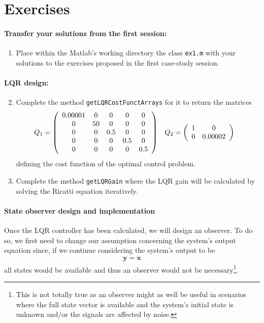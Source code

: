 %
\section{Exercises}
	\paragraph{Transfer your solutions from the first session:}
	\begin{enumerate}
		\item Place within the Matlab's working directory the class \texttt{ex1.m} with your solutions to the exercises proposed in the first case-study session. 
	\end{enumerate}
	\paragraph{LQR design:}
	\begin{enumerate}
		\setcounter{enumi}{1}
		\item Complete the method \texttt{getLQRCostFunctArrays} for it to return the matrices %
		\begin{align}
			Q_1 & = \matriz{ccccc}{
				0.00001 & 0 & 0 & 0 & 0 \\
				0 & 50 & 0 & 0 & 0 \\
				0 & 0 & 0.5 & 0 & 0 \\
				0 & 0 & 0 & 0.5 & 0 \\
				0 & 0 & 0 & 0 & 0.5
			} & 
			Q_2 & = \matriz{cc}{
				1 & 0\\
				0 & 0.00002
			}
		\end{align}
		defining the cost function of the optimal control problem. 

		\item Complete the method \texttt{getLQRGain} where the LQR gain will be calculated by solving the Ricatti equation iteratively.

	\end{enumerate}

	\paragraph{State observer design and implementation}
	Once the LQR controller has been calculated, we will design an observer. 
	To do so, we first need to change our assumption concerning the system's output equation since, if we continue considering the system's output to be 
	\begin{align}
		\mathbf{y} = \mathbf{x}
	\end{align}
	all states would be available and thus an observer would not be necessary\footnote{This is not totally true as an observer might as well be useful in scenarios where the full state vector is available and the system's initial state is unknown and/or the signals are affected by noise.}. 

